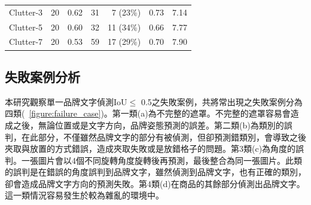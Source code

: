 \begin{table}[H]
\begin{tabular}{l|cc|crcc}
Clutter-3                      & 20                        & 0.62                         & 31                      & 7  (23\%)                         & 0.73                          &  7.14                               \\
Clutter-5                      & 20                        & 0.60                         & 32                      & 11 (34\%)                         & 0.66                          &  7.77                               \\
Clutter-7                      & 20                        & 0.53                         & 59                      & 17 (29\%)                         & 0.70                          &  7.90                               \\ \hline
\end{tabular}
\end{table}

\subsection{失敗案例分析}
本研究觀察單一品牌文字偵測IoU$ \le$ 0.5之失敗案例，共將常出現之失敗案例分為四類(~\ref{figure:failure_case})。第一類(a)為不完整的遮罩。不完整的遮罩容易會造成之後，無論位置或是文字方向，品牌姿態預測的誤差。第二類(b)為類別的誤判，在此部分，不僅雖然品牌文字的部分有被偵測，但卻預測錯類別，會導致之後夾取與放置的方式錯誤，造成夾取失敗或是放錯格子的問題。第3類(c)為角度的誤判。一張圖片會以4個不同旋轉角度旋轉後再預測，最後整合為同一張圖片。此類的誤判是在錯誤的角度誤判到品牌文字，雖然偵測到品牌文字，也有正確的類別，卻會造成品牌文字方向的預測失敗。第4類(d)在商品的其餘部分偵測出品牌文字。這一類情況容易發生於較為雜亂的環境中。

